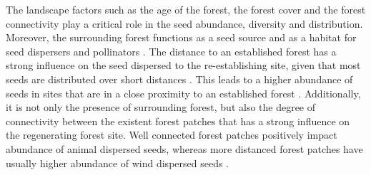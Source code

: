 
The landscape factors such as the age of the forest, the forest cover and the forest connectivity play a critical role in the seed abundance, diversity and distribution. Moreover, the surrounding forest functions as a seed source and as a habitat for seed dispersers and pollinators \citep{hordijkLandUseHistory2024, arroyo-rodriguezMultipleSuccessionalPathways2017}. The distance to an established forest has a strong influence on the seed dispersed to the re-establishing site, given that most seeds are distributed over short distances \citep{chazdonSecondGrowthPromise2014}. This leads to a higher abundance of seeds in sites that are in a close proximity to an established forest \citep{hordijkLandUseHistory2024}. Additionally, it is not only the presence of surrounding forest, but also the degree of connectivity between the existent forest patches that has a strong influence on the regenerating forest site. Well connected forest patches positively impact abundance of animal dispersed seeds, whereas more distanced forest patches have usually higher abundance of wind dispersed seeds \citep{dentUnitingNicheDifferentiation2021}.



